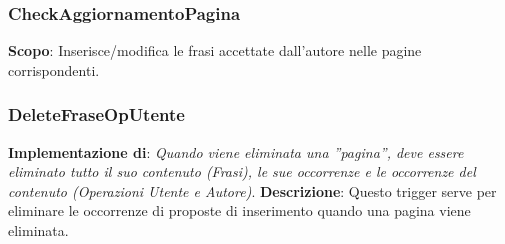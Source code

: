 \newpage
\subsubsection{CheckAggiornamentoPagina}
\textbf{Scopo}: Inserisce/modifica le frasi accettate dall'autore nelle pagine corrispondenti.\newline\newline


\subsubsection{DeleteFraseOpUtente}
\textbf{Implementazione di}: \textit{Quando viene eliminata una ”pagina”, deve essere eliminato tutto il suo contenuto (Frasi), le sue occorrenze e le occorrenze del contenuto (Operazioni Utente e Autore)}.\newline\newline
\textbf{Descrizione}: Questo trigger serve per eliminare le occorrenze di proposte di inserimento quando una pagina viene eliminata.\newline
